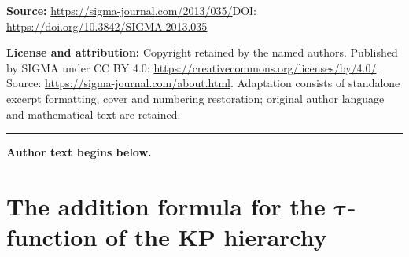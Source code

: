 \documentclass[11pt]{article}
\begin{document}
\noindent\textbf{Source:} \url{https://sigma-journal.com/2013/035/}\quad DOI: \url{https://doi.org/10.3842/SIGMA.2013.035}\par
\noindent\textbf{License and attribution:} Copyright retained by the named authors. Published by SIGMA under CC BY 4.0: \url{https://creativecommons.org/licenses/by/4.0/}. Source: \url{https://sigma-journal.com/about.html}. Adaptation consists of standalone excerpt formatting, cover and numbering restoration; original author language and mathematical text are retained.\par
\medskip\hrule\medskip\noindent\textbf{Author text begins below.}\par
\setcounter{section}{1}
\setcounter{subsection}{0}
\setcounter{subsubsection}{0}
\setcounter{Theorem}{0}
\setcounter{equation}{4}
\section[The addition formula for the $\tau$-function of the KP hierarchy]{The addition formula for the $\boldsymbol{\tau}$-function of the KP hierarchy} \label{section2}
\end{document}
